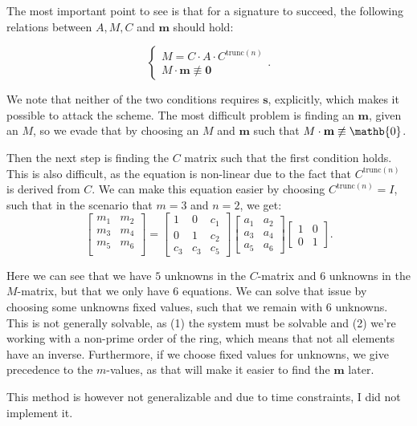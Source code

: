 \documentclass{article}
\begin{document}
The most important point to see is that for a signature to succeed, the
following relations between $A, M, C$ and $\mathbf{m}$ should hold:

\begin{equation}
\begin{cases}
  M = C \cdot A \cdot C^{\text{trunc}(n)} \\
  M \cdot \mathbf{m} \not\equiv \mathbf{0}
\end{cases}.
\end{equation} 

We note that neither of the two conditions requires $\mathbf{s}$, explicitly,
which makes it possible to attack the scheme. The most difficult problem is
finding an $\mathbf{m}$, given an $M$, so we evade that by choosing an $M$ and
$\mathbf{m}$ such that $M \cdot \mathbf{m} \not\equiv \mathb{0}$.

Then the next step is finding the $C$ matrix such that the first condition
holds. This is also difficult, as the equation is non-linear due to the fact
that $C^{\text{trunc}(n)}$ is derived from  $C$. We can make this equation
easier by choosing $C^{\text{trunc}(n)} = I$, such that in the scenario that $m
= 3$ and $n = 2$, we get: 
\begin{equation}
  \begin{bmatrix}
    m_1 & m_2  \\
      m_3 & m_4 \\
      m_5 & m_6 \\
      \end{bmatrix}  = \begin{bmatrix} 1 & 0 & c_1 \\ 0 & 1 & c_2 \\ c_3 & c_3 &
      c_5\end{bmatrix} \begin{bmatrix} a_1 & a_2 \\ a_3 & a_4 \\ a_5 & a_6
      \end{bmatrix} \begin{bmatrix} 1 & 0 \\ 0 & 1 \end{bmatrix}.
\end{equation} 

Here we can see that we have $5$ unknowns in the $C$-matrix and $6$ unknowns in
the $M$-matrix, but that we only have 6 equations. We can solve that issue by
choosing some unknowns fixed values, such that we remain with 6 unknowns. This
is not generally solvable, as (1) the system must be solvable and (2) we're
working with a non-prime order of the ring, which means that not all elements
have an inverse. Furthermore, if we choose fixed values for unknowns, we give
precedence to the $m$-values, as that will make it easier to find the
$\mathbf{m}$ later.

This method is however not generalizable and due to time constraints, I did not
implement it.

\printbibliography
\end{document}
